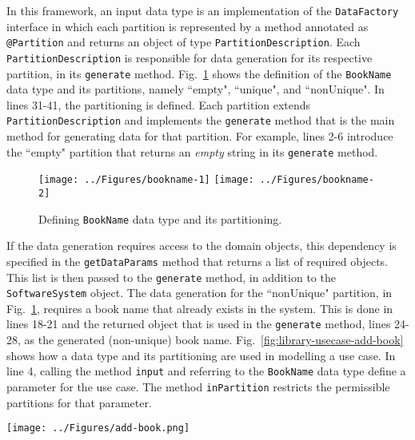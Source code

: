 In this framework, an input data type is an implementation of the \texttt{DataFactory} interface in which each partition is represented by a method annotated as \texttt{@Partition} and returns an object of type \texttt{PartitionDescription}. Each \texttt{PartitionDescription} is responsible for data generation for its respective partition, in its \texttt{generate} method. Fig.~\ref{fig:library-bookname} shows the definition of the \texttt{BookName} data type and its partitions, namely ``empty", ``unique", and ``nonUnique". In lines 31-41, the partitioning is defined. Each partition extends  \texttt{PartitionDescription} and implements the \texttt{generate} method that is the main method for generating data for that partition. For example, lines 2-6 introduce the ``empty" partition that returns an \textit{empty} string in its \texttt{generate} method.

\begin{figure}[h]
\centering
{\texttt{[image: ../Figures/bookname-1]}%
\label{fig:library-bookname-1}}
\hfil
{\texttt{[image: ../Figures/bookname-2]}%
\label{fig:library-bookname-2}}
\caption{Defining \texttt{BookName} data type and its partitioning.}
\label{fig:library-bookname}
\end{figure} 

If the data generation requires access to the domain objects, this dependency is specified in the \texttt{getDataParams} method that returns a list of required objects. This list is then passed to the \texttt{generate} method, in addition to the \texttt{SoftwareSystem} object. The data generation for the ``nonUnique" partition, in Fig.~\ref{fig:library-bookname}, requires a book name that already exists in the system. This is done in lines 18-21 and the returned object that is used in the \texttt{generate} method, lines 24-28, as the generated (non-unique) book name. Fig.~\ref{fig:library-usecase-add-book} shows how a data type and its partitioning are used in modelling a use case. In line 4, calling the method \texttt{input} and referring to the \texttt{BookName} data type define a parameter for the use case. The method \texttt{inPartition} restricts the permissible partitions for that parameter.

\begin{figure*}[h]
\centering
\texttt{[image: ../Figures/add-book.png]}
\caption{Using the data types and their partitioning in use case modelling.}
\label{fig:library-usecase-add-book}
\end{figure*}

